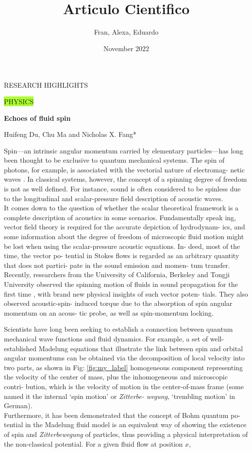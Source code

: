 \documentclass[7pt]{article}
\title{Articulo Cientifico}
\author{Fran, Alexa, Eduardo}
\date{November 2022}
\begin{document}

\textcolor{BrickRed}{\Large{\Huge{RESEARCH HIGHLIGHTS}}}
\vspace{1.75cm}

\textup{\colorbox{GreenYellow}{\large{PHYSICS}}}
\vspace{0.25cm}

\textbf{{\Large{Echoes of fluid spin}}}
\vspace{0.5cm}

{\Large{Huifeng Du, Chu Ma and Nicholas X. Fang*}}


\begin{multicols}{3}

Spin—an intrinsic angular momentum carried by elementary particles—has long been thought to be exclusive to quantum mechanical systems. The spin of photons, for example, is associated with the vectorial nature of electromag- netic waves \cite{1}. In classical systems, however, the concept of a spinning degree of freedom is not as well defined. For instance, sound is often considered to be spinless due to the longitudinal and scalar-pressure field description of acoustic waves.\\
It comes down to the question of whether the scalar theoretical framework is a complete description of acoustics in some scenarios. Fundamentally speak ing, vector field theory is required for the accurate depiction of hydrodynam- ics, and some information about the degree of freedom of microscopic fluid motion might be lost when using the scalar-pressure acoustic equations. In- deed, most of the time, the vector po- tential in Stokes flows is regarded as an arbitrary quantity that does not partici- pate in the sound emission and momen- tum transfer. Recently, researchers from the University of California, Berkeley and Tongji University observed the spinning motion of fluids in sound propagation for the first time \cite{2}, with brand new physical insights of such vector poten- tials. They also observed acoustic-spin- induced torque due to the absorption of spin angular momentum on an acous- tic probe, as well as spin-momentum locking.

Scientists have long been seeking to establish a connection between
quantum mechanical wave functions and fluid dynamics. For example, a set of well-established Madelung equations that illustrate the link between spin and orbital angular momentums \cite{3} can be obtained via the decomposition of local velocity into two parts, as shown in Fig: \ref{fig:my_label} homogeneous component representing the velocity of the center of mass, plus the inhomogeneous and microscopic contri- bution, which is the velocity of motion in the center-of-mass frame (some named it the internal ‘spin motion’ or {\it{Zitterbe- wegung}}, ‘trembling motion’ in German). \\
Furthermore, it has been demonstrated that the concept of Bohm quantum po- tential in the Madelung fluid model is an equivalent way of showing the existence of spin and {\it{Zitterbewegung}} of particles, thus providing a physical interpretation of the non-classical potential. For a given fluid flow at position $x$,


\end{multicols}
\end{document}

